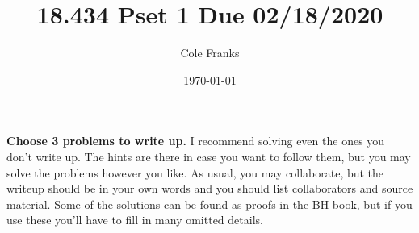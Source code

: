 \documentclass[11pt, oneside]{article}   	%
\title{18.434 Pset 1 Due 02/18/2020}
\author{Cole Franks}
\date{\today}							%
\begin{document}
\maketitle
\textbf{Choose 3 problems to write up.} I recommend solving even the ones you don't write up. The hints are there in case you want to follow them, but you may solve the problems however you like. As usual, you may collaborate, but the writeup should be in your own words and you should list collaborators and source material. Some of the solutions can be found as proofs in the BH book, but if you use these you'll have to fill in many omitted details.
\end{document}

